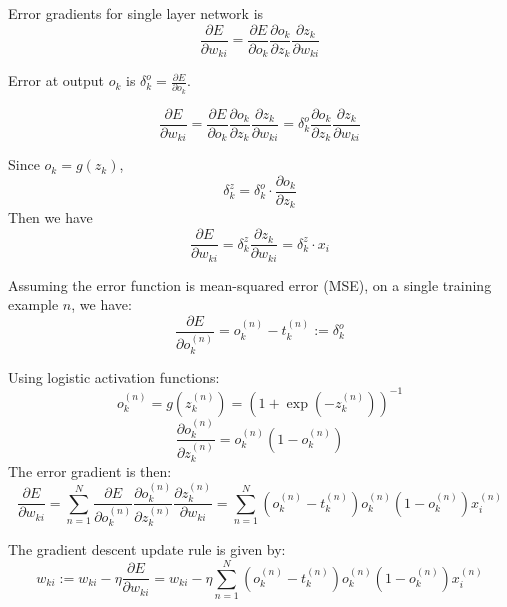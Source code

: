 Error gradients for single layer network is 
$$\frac{\partial E}{\partial w_{ki}} = 
    \frac{\partial E}{\partial o_{k}} 
    \frac{\partial o_{k}}{\partial z_{k}} 
    \frac{\partial z_{k}}{\partial w_{ki}} $$

Error at output $o_k$ is $\delta_k^o =  \frac{\partial E}{\partial o_{k}} $.

$$\frac{\partial E}{\partial w_{ki}} = 
    \frac{\partial E}{\partial o_{k}} 
    \frac{\partial o_{k}}{\partial z_{k}} 
    \frac{\partial z_{k}}{\partial w_{ki}} 
    =  
    \delta_k^o 
    \frac{\partial o_{k}}{\partial z_{k}} 
    \frac{\partial z_{k}}{\partial w_{ki}}  
    $$

Since $o_k = g(z_k)$, $$\delta_k^z = \delta_k^o \cdot \frac{\partial o_{k}}{\partial z_{k}}$$
Then we have 
$$\frac{\partial E}{\partial w_{ki}} = \delta_k^z \frac{\partial z_{k}}{\partial w_{ki}} =  \delta_k^z \cdot x_i$$ 


Assuming the error function is mean-squared error (MSE), on a single training example $n$, we have:
$$\frac{\partial E}{\partial o_k^{(n)}} = o_k^{(n)} - t_k^{(n)} := \delta_k^o$$

Using logistic activation functions:
$$ o_k^{(n)} = g(z_k^{(n)}) = (1 + \exp(-z_k^{(n)}))^{-1}$$
$$\frac{\partial o_k^{(n)}}{\partial z_k^{(n)}} = o_k^{(n)}(1-o_k^{(n)})$$
The error gradient is then:
$$\frac{\partial E}{\partial w_{ki}} =  \sum_{n=1}^N \frac{\partial E}{\partial o_{k}^{(n)}}\frac{\partial o_{k}^{(n)}}{\partial z_{k}^{(n)}} \frac{\partial z_{k}^{(n)}}{\partial w_{ki}} = \sum_{n=1}^N (o_k^{(n)} - t_k^{(n)})o_k^{(n)} (1-o_k^{(n)}) x_i^{(n)}$$

The gradient descent update rule is given by:
$$w_{ki} := w_{ki} - \eta \frac{\partial E}{\partial w_{ki}} = w_{ki} - \eta  \sum_{n=1}^N (o_k^{(n)} - t_k^{(n)})o_k^{(n)} (1-o_k^{(n)}) x_i^{(n)}$$

